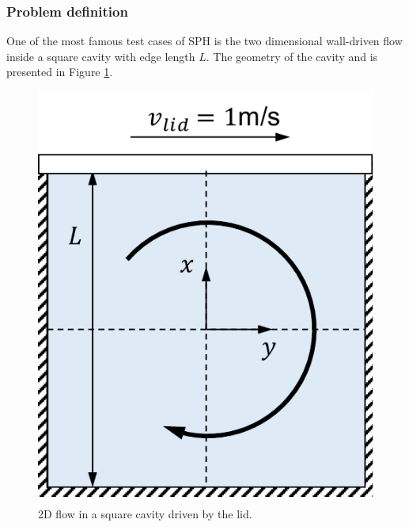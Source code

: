 \documentclass[a4paper,12pt,openany]{book}
\theoremstyle{break}
\begin{document}
\subsubsection{Problem definition}
One of the most famous test cases of SPH is the two dimensional wall-driven flow inside a square cavity with edge length $L$. The geometry of the cavity and is presented in Figure \ref{fig:liddrivencavitysph}. 
\begin{figure}[h!]
  \includegraphics[scale=0.6]{liddrivencavity.pdf}
  \centering
  \caption{2D flow in a square cavity driven by the lid.}
  \label{fig:liddrivencavitysph}
\end{figure}\vspace*{3pt}
\end{document}
